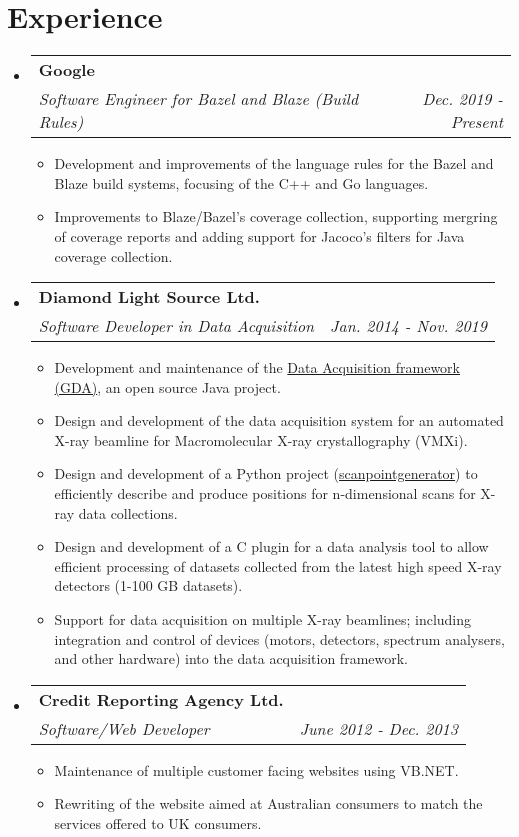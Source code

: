 \documentclass[11pt]{article}
\makeatletter
\newcommand{\cvheading}[3]{
    \begin{tabular*}{0.9\textwidth}[t]{l@{\extracolsep{\fill}}r}
        \textbf{#1}\\
        \textit{#2} & \textit{#3}\\
    \end{tabular*}\vspace{-5pt}
}
\newcommand{\cvitem}[1]{\item #1\vspace{-2pt}}
\makeatother
\begin{document}
\section{Experience}
\begin{itemize}
    \item
        \cvheading
            {Google}
            {Software Engineer for Bazel and Blaze (Build Rules)}{Dec. 2019 - Present}
            \begin{itemize}
            \cvitem
                {Development and improvements of the language rules for the Bazel and Blaze build systems,
                focusing of the C++ and Go languages.}
            \cvitem
                {Improvements to Blaze/Bazel's coverage collection, supporting mergring of coverage reports and
                adding support for Jacoco's filters for Java coverage collection.}
            \end{itemize}
    \item
        \cvheading
            {Diamond Light Source Ltd.}
            {Software Developer in Data Acquisition}{Jan. 2014 - Nov. 2019}
            \begin{itemize}
            \cvitem
                {Development and maintenance of the
                \href{https://github.com/openGDA}{Data Acquisition framework (GDA)}, an open source Java project.}
            \cvitem
                {Design and development of the data acquisition system for an automated X-ray beamline for
                Macromolecular X-ray crystallography (VMXi).}
            \cvitem
                {Design and development of a Python project
                (\href{https://github.com/dls-controls/scanpointgenerator}{scanpointgenerator})
                to efficiently describe and produce positions for n-dimensional scans for X-ray data collections.}
            \cvitem
                {Design and development of a C plugin for a data analysis tool to allow efficient processing of datasets
                collected from the latest high speed X-ray detectors (1-100 GB datasets).}
            \cvitem
                {Support for data acquisition on multiple X-ray beamlines; including integration and control of devices
                (motors, detectors, spectrum analysers, and other hardware) into the data acquisition framework.}
            \end{itemize}
    \item
        \cvheading
            {Credit Reporting Agency Ltd.}
            {Software/Web Developer}{June 2012 - Dec. 2013}
            \begin{itemize}
            \cvitem
                {Maintenance of multiple customer facing websites using VB.NET.}
            \cvitem
                {Rewriting of the website aimed at Australian consumers to match the services
                offered to UK consumers.}
            \end{itemize}

\end{itemize}
\end{document}
